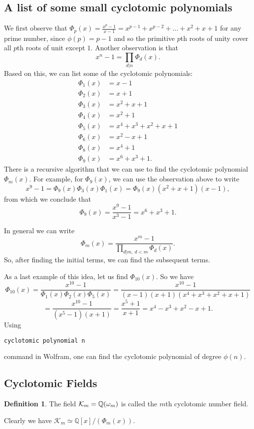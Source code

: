 \documentclass[12pt]{article}
\theoremstyle{plain}
\theoremstyle{definition}
\newtheorem{definition}{Definition}
\theoremstyle{remark}
\begin{document}
\subsection{A list of some small cyclotomic polynomials}
We first observe that
$\Phi_p(x) = \frac{x^p-1}{x-1}=x^{p-1}+x^{p-2}+\dots +x^2+x+1$ for any prime number, since $\phi(p)=p-1$ and so the primitive $p$th roots of unity cover all $p$th roots of unit except $1$.
Another observation is that
$$x^n-1 = \prod_{d|n}\Phi_d(x).$$
Based on this, we can list some of the cyclotomic polynomials:
\begin{align*}
    \Phi_1(x)&=x-1\\
    \Phi_2(x)& =x+1\\
    \Phi_3(x)&=x^2+x+1\\
    \Phi_4(x)&=x^2+1\\
    \Phi_5(x)&=x^4+x^3+x^2+x+1\\
    \Phi_6(x)&=x^2-x+1\\
    \Phi_8(x)&=x^4+1\\
    \Phi_9(x)& = x^6+x^3+1.
\end{align*}
There is a recursive algorithm that we can use to find the cyclotomic polynomial $\Phi_m(x)$. For example, for $\Phi_9(x)$, we can use the observation above to write
$$x^9-1=\Phi_9(x)\Phi_3(x)\Phi_1(x) = \Phi_9(x)(x^2+x+1)(x-1),$$
from which we conclude that
$$\Phi_9(x)=\frac{x^9-1}{x^3-1} = x^6+x^3+1.$$

In general we can write
$$\Phi_m(x) = \frac{x^m-1}{\prod_{d|m,\:d<m}\Phi_d(x)}.$$
So, after finding the initial terms, we can find the subsequent terms.

As a last example of this idea, let us find $\Phi_{10}(x)$. So we have
$$\Phi_{10}(x) = \frac{x^{10}-1}{\Phi_1(x)\Phi_2(x)\Phi_5(x)}
=\frac{x^{10}-1}{(x-1)(x+1)(x^4+x^3+x^2+x+1)}$$
$$=\frac{x^{10}-1}{(x^5-1)(x+1)} = \frac{x^5+1}{x+1} = x^4-x^3+x^2-x+1.$$
Using \begin{verbatim}cyclotomic polynomial n \end{verbatim}
command in Wolfram, one can find the cyclotomic polynomial of degree $\phi(n)$.
\subsection{Cyclotomic Fields}
\begin{definition}
The field $\mathcal{K}_m = \mathbb{Q}(\omega_m)$ is called the $m$th cyclotomic number field.
\end{definition}
Clearly we have $\mathcal{K}_m \simeq \mathbb{Q}[x]/(\Phi_m(x))$.
\end{document}
